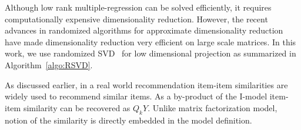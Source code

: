 Although low rank multiple-regression can be solved efficiently, it requires computationally expensive dimensionality reduction. However, the recent advances in randomized algorithms for approximate dimensionality reduction~\citep{halko2011} have made dimensionality reduction very efficient on large scale matrices. In this work, we use randomized SVD~\citep{halko2011} for low dimensional projection as summarized in Algorithm~\ref{algo:RSVD}.

As discussed earlier, in a real world recommendation item-item similarities are widely used to recommend similar items. As a by-product of the I-\LinearLow model item-item similarity can be recovered as $Q_kY$. Unlike matrix factorization model, notion of the similarity is directly embedded in the model definition.

\begin{equation*}
\end{equation*}


